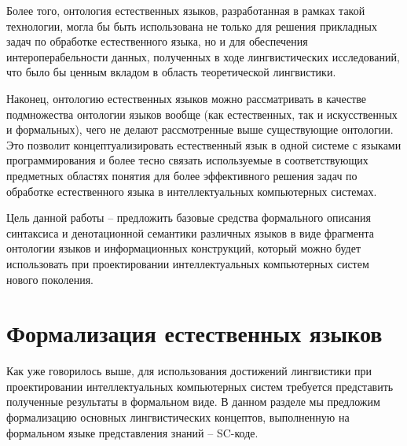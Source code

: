 Более того, онтология естественных языков, разработанная в рамках такой технологии, могла бы быть использована не только для решения прикладных задач по обработке естественного языка, но и для обеспечения интероперабельности данных, полученных в ходе лингвистических исследований, что было бы ценным вкладом в область теоретической лингвистики.

Наконец, онтологию естественных языков можно рассматривать в качестве подмножества онтологии языков вообще (как естественных, так и искусственных и формальных), чего не делают рассмотренные выше существующие онтологии.
Это позволит концептуализировать естественный язык в одной системе с языками программирования и более тесно связать используемые в соответствующих предметных областях понятия для более эффективного решения задач по обработке естественного языка в интеллектуальных компьютерных системах.

Цель данной работы -- предложить базовые средства формального описания синтаксиса и денотационной семантики различных языков в виде фрагмента онтологии языков и информационных конструкций, который можно будет использовать при проектировании интеллектуальных компьютерных систем нового поколения.

\section{Формализация естественных языков}
\label{section_natural_languages_formalization}

Как уже говорилось выше, для использования достижений лингвистики при проектировании интеллектуальных компьютерных систем требуется представить полученные результаты в формальном виде.
В данном разделе мы предложим формализацию основных лингвистических концептов, выполненную на формальном языке представления знаний -- SC-коде.

